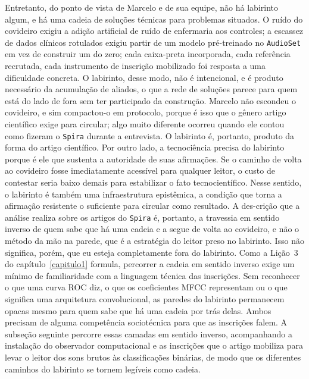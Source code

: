 Entretanto, do ponto de vista de Marcelo e de sua equipe, não há labirinto algum, e há uma cadeia de soluções técnicas para problemas situados. O ruído do covideiro exigiu a adição artificial de ruído de enfermaria aos controles; a escassez de dados clínicos rotulados exigiu partir de um modelo pré-treinado no \texttt{AudioSet} em vez de construir um do zero; cada caixa-preta incorporada, cada referência recrutada, cada instrumento de inscrição mobilizado foi resposta a uma dificuldade concreta. O labirinto, desse modo, não é intencional, e é produto necessário da acumulação de aliados, o que a rede de soluções parece para quem está do lado de fora sem ter participado da construção. Marcelo não escondeu o covideiro, e sim compactou-o em protocolo, porque é isso que o gênero artigo científico exige para circular; algo muito diferente ocorreu quando ele contou como fizeram o \texttt{Spira} durante a entrevista. O labirinto é, portanto, produto da forma do artigo científico. Por outro lado, a tecnociência precisa do labirinto porque é ele que sustenta a autoridade de suas afirmações. Se o caminho de volta ao covideiro fosse imediatamente acessível para qualquer leitor, o custo de contestar seria baixo demais para estabilizar o fato tecnocientífico. Nesse sentido, o labirinto é também uma infraestrutura epistêmica, a condição que torna a afirmação resistente o suficiente para circular como resultado. A des-crição que a análise realiza sobre os artigos do \texttt{Spira} é, portanto, a travessia em sentido inverso de quem sabe que há uma cadeia e a segue de volta ao covideiro, e não o método da mão na parede, que é a estratégia do leitor preso no labirinto. Isso não significa, porém, que eu esteja completamente fora do labirinto. Como a Lição~3 do capítulo~\ref{capitulo1} formula, percorrer a cadeia em sentido inverso exige um mínimo de familiaridade com a linguagem técnica das inscrições. Sem reconhecer o que uma curva ROC diz, o que os coeficientes MFCC representam ou o que significa uma arquitetura convolucional, as paredes do labirinto permanecem opacas mesmo para quem sabe que há uma cadeia por trás delas. Ambos precisam de alguma competência sociotécnica para que as inscrições falem. A subseção seguinte percorre essas camadas em sentido inverso, acompanhando a instalação do observador computacional e as inscrições que o artigo mobiliza para levar o leitor dos sons brutos às classificações binárias, de modo que os diferentes caminhos do labirinto se tornem legíveis como cadeia.

